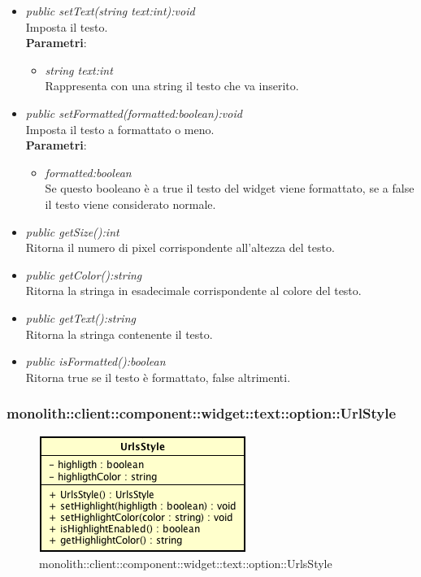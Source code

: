 \begin{itemize}
\begin{itemize}
\begin{itemize}
		\end{itemize} 
	\item \textit{public setText(string text:int):void}\\
	Imposta il testo.
		\\ \textbf{Parametri}: \begin{itemize}
		\item \textit{string text:int}\\
		Rappresenta con una string il testo che va inserito.
		\end{itemize} 
	\item \textit{public setFormatted(formatted:boolean):void}\\
	Imposta il testo a formattato o meno.
		\\ \textbf{Parametri}: \begin{itemize}
		\item \textit{formatted:boolean}\\
		Se questo booleano è a true il testo del widget viene formattato, se a false il testo viene considerato normale.
		\end{itemize} 
	\item \textit{public getSize():int}\\
	Ritorna il numero di pixel corrispondente all'altezza del testo.
	\item \textit{public getColor():string}\\
	Ritorna  la stringa in esadecimale corrispondente al colore del testo.
	\item \textit{public getText():string}\\
	Ritorna la stringa contenente il testo.
	\item \textit{public isFormatted():boolean}\\
	Ritorna true se il testo è formattato, false altrimenti.
	\end{itemize}
\end{itemize}

\subsubsection{monolith::client::component::widget::text::option::UrlStyle}

\label{monolith::client::component::widget::text::option::UrlsStyle}
\begin{figure}[H]
	\centering
	\includegraphics[scale=0.5]{Sezioni/SottosezioniST/img/UrlsStyle.png}
	\caption{monolith::client::component::widget::text::option::UrlsStyle}
\end{figure}

